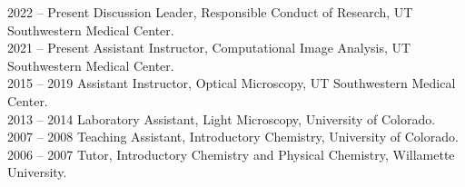 2022 -- Present \hspace{14pt} Discussion Leader, Responsible Conduct of Research, UT Southwestern Medical Center. \\ 
2021 -- Present \hspace{14pt} Assistant Instructor, Computational Image Analysis, UT Southwestern Medical Center. \\
2015 -- 2019 \hspace{28pt} Assistant Instructor, Optical Microscopy, UT Southwestern Medical Center. \\
2013 -- 2014 \hspace{28pt} Laboratory Assistant, Light Microscopy, University of Colorado. \\
2007 -- 2008 \hspace{28pt} Teaching Assistant, Introductory Chemistry, University of Colorado.  \\
2006 -- 2007 \hspace{28pt} Tutor, Introductory Chemistry and Physical Chemistry, Willamette University. \vspace{6pt}